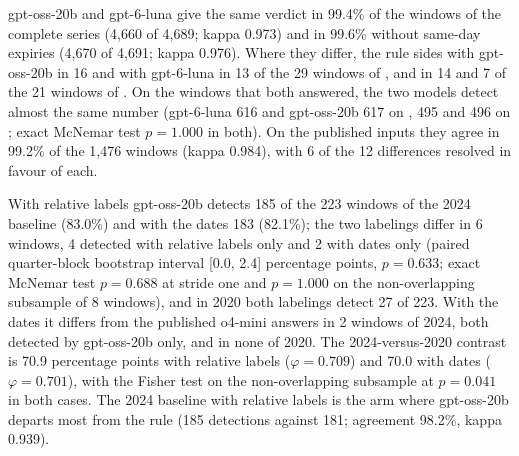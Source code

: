 gpt-oss-20b and gpt-6-luna give the same verdict in 99.4\% of the windows of the complete series (4{,}660 of 4{,}689; kappa 0.973) and in 99.6\% without same-day expiries (4{,}670 of 4{,}691; kappa 0.976). Where they differ, the rule sides with gpt-oss-20b in 16 and with gpt-6-luna in 13 of the 29 windows of , and in 14 and 7 of the 21 windows of . On the windows that both answered, the two models detect almost the same number (gpt-6-luna 616 and gpt-oss-20b 617 on , 495 and 496 on ; exact McNemar test $p=1.000$ in both). On the published inputs they agree in 99.2\% of the 1{,}476 windows (kappa 0.984), with 6 of the 12 differences resolved in favour of each.

With relative labels gpt-oss-20b detects 185 of the 223 windows of the 2024 baseline (83.0\%) and with the dates 183 (82.1\%); the two labelings differ in 6 windows, 4 detected with relative labels only and 2 with dates only (paired quarter-block bootstrap interval [0.0, 2.4] percentage points, $p=0.633$; exact McNemar test $p=0.688$ at stride one and $p=1.000$ on the non-overlapping subsample of 8 windows), and in 2020 both labelings detect 27 of 223. With the dates it differs from the published o4-mini answers in 2 windows of 2024, both detected by gpt-oss-20b only, and in none of 2020. The 2024-versus-2020 contrast is 70.9 percentage points with relative labels ($\varphi=0.709$) and 70.0 with dates ($\varphi=0.701$), with the Fisher test on the non-overlapping subsample at $p=0.041$ in both cases. The 2024 baseline with relative labels is the arm where gpt-oss-20b departs most from the rule (185 detections against 181; agreement 98.2\%, kappa 0.939).

